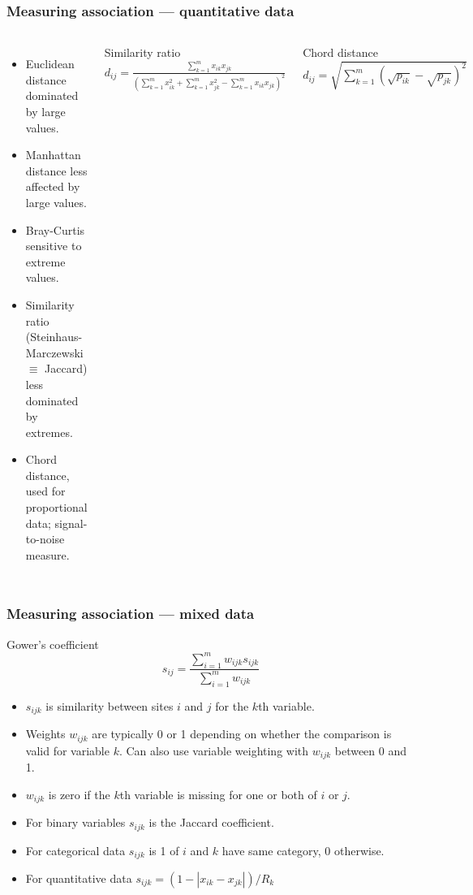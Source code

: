 \documentclass{beamer}
\begin{document}
\begin{frame}
   \frametitle{Measuring association --- quantitative data}
   \begin{columns}
      \column{7cm}
      \begin{itemize}
         \item Euclidean distance dominated by large values.
         \item Manhattan distance less affected by large values.
         \item Bray-Curtis sensitive to extreme values.
         \item Similarity ratio (Steinhaus-Marczewski $\equiv$ Jaccard) less dominated by extremes.
         \item Chord distance, used for proportional data; \alert{signal-to-noise} measure.
      \end{itemize}

      \column{5cm}
      \begin{block}{Similarity ratio}
         $d_{ij} = \frac{\sum\limits^m_{k=1}x_{ik}x_{jk}}{\left(\sum\limits^m_{k=1}x_{ik}^2 + \sum\limits^m_{k=1}x_{jk}^2 - \sum\limits^m_{k=1}x_{ik}x_{jk}\right)^2}$
      \end{block}
      \begin{block}{Chord distance}
         $d_{ij} = \sqrt{\sum\limits^m_{k=1}(\sqrt{p_{ik}} - \sqrt{p_{jk}})^2}$
      \end{block}
   \end{columns}
\end{frame}

\begin{frame}
   \frametitle{Measuring association --- mixed data}
   \begin{block}{Gower's coefficient}
   $$s_{ij} = \frac{\sum\limits^m_{i=1} w_{ijk}s_{ijk}}{\sum\limits^m_{i=1} w_{ijk}}$$
   \end{block}
   \begin{itemize}
      \item $s_{ijk}$ is similarity between sites $i$ and $j$ for the $k$th variable.
      \item Weights $w_{ijk}$ are typically 0 or 1 depending on whether the comparison is valid for variable $k$. Can also use variable weighting with $w_{ijk}$ between 0 and 1.
      \item $w_{ijk}$ is zero if the $k$th variable is missing for one or both of $i$ or $j$.
      \item For binary variables $s_{ijk}$ is the Jaccard coefficient.
      \item For categorical data $s_{ijk}$ is 1 of $i$ and $k$ have same category, 0 otherwise.
      \item For quantitative data $s_{ijk} = (1 - |x_{ik} - x_{jk}|) / R_k$
   \end{itemize}
\end{frame}
\end{document}
